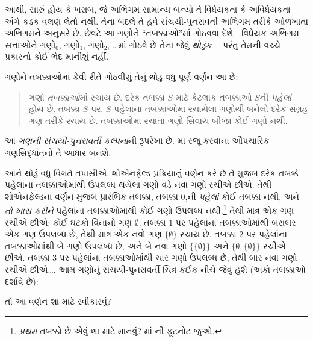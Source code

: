 આથી, સારું હોય કે ખરાબ, જે અભિગમ સામાન્ય બન્યો તે વિધેયકતા કે
અવિધેયકતા અંગે કડક વલણ લેતો નથી. તેના બદલે તે હવે સંચયી-પુનરાવર્તી
અભિગમ તરીકે ઓળખાતા અભિગમને અનુસરે છે. છેવટે આ ગણોને
``તબક્કાઓ''માં ગોઠવવા દેશે---વિધેયક અભિગમ સત્તાઓને ગણો$_0$,
ગણો$_1$, ગણો$_2$, \ldots{}માં ગોઠવે છે તેના જેવું \emph{થોડુંક}---
પરંતુ તેમની વચ્ચે પ્રકારનો કોઈ ભેદ માનીશું નહીં.
\endgroup

\begingroup
\makeatletter{}\makeatother

\label{guunit:OLP-0534}


ગણોને તબક્કાઓમાં કેવી રીતે ગોઠવીશું તેનું થોડું વધુ પૂર્ણ વર્ણન
આ છે:
\begin{quote}
ગણો \emph{તબક્કાઓ}માં રચાય છે. દરેક તબક્કા $S$ માટે કેટલાક
તબક્કાઓ $S$ની \emph{પહેલાં} હોય છે. તબક્કા $S$ પર, $S$ પહેલાંના
તબક્કાઓમાં રચાયેલા ગણોથી બનેલો દરેક સંગ્રહ ગણ તરીકે રચાય છે.
તબક્કાઓમાં રચાતા ગણો સિવાય બીજા કોઈ ગણો નથી.
\citep[p.~323]{Shoenfield:AST}
\end{quote}
આ \emph{ગણની સંચયી-પુનરાવર્તી કલ્પના}ની રૂપરેખા છે.
માં રજૂ કરવાના ઔપચારિક ગણસિદ્ધાંતનો તે
આધાર બનશે.

આને થોડું વધુ વિગતે તપાસીએ. શોએનફેલ્ડ પ્રક્રિયાનું વર્ણન કરે છે
તે મુજબ દરેક તબક્કે પહેલાંના તબક્કાઓમાંથી ઉપલબ્ધ થયેલા ગણો
વડે નવા ગણો રચીએ છીએ. તેથી શોએનફેલ્ડના વર્ણન મુજબ પ્રારંભિક
તબક્કા, તબક્કા $0$,ની \emph{પહેલાં} કોઈ તબક્કા નથી, અને
\emph{તો ખાસ કરીને} પહેલાંના તબક્કાઓમાંથી કોઈ ગણો ઉપલબ્ધ
નથી.\footnote{\emph{પ્રથમ} તબક્કો છે એવું શા માટે માનવું?
માં \stagesord{}ની ફૂટનોટ જુઓ.}
તેથી માત્ર એક ગણ રચીએ છીએ: કોઈ ઘટકો વિનાનો ગણ
$\emptyset$. તબક્કા $1$ પર પહેલાંના તબક્કાઓમાંથી બરાબર એક ગણ
ઉપલબ્ધ છે, તેથી માત્ર એક નવો ગણ $\{\emptyset\}$ રચાય છે.
તબક્કા $2$ પર પહેલાંના તબક્કાઓમાંથી બે ગણો ઉપલબ્ધ છે, અને
બે નવા ગણો $\{\{\emptyset\}\}$ અને
$\{\emptyset, \{\emptyset\}\}$ રચીએ છીએ. તબક્કા $3$ પર
પહેલાંના તબક્કાઓમાંથી ચાર ગણો ઉપલબ્ધ છે, તેથી બાર નવા ગણો
રચીએ છીએ\ldots. આમ ગણોનું સંચયી-પુનરાવર્તી ચિત્ર કંઈક નીચે
જેવું હશે (અંકો તબક્કાઓ દર્શાવે છે):
\begin{center}
\end{center}
તો આ વર્ણન શા માટે સ્વીકારવું?


